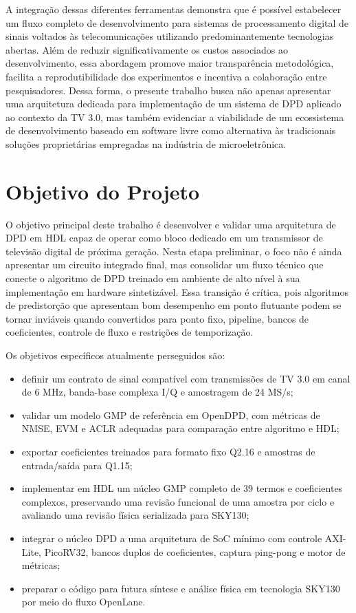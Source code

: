\documentclass[journal,comsoc]{IEEEtran}
\begin{document}
A integração dessas diferentes ferramentas demonstra que é possível estabelecer um fluxo completo de desenvolvimento para sistemas de processamento digital de sinais voltados às telecomunicações utilizando predominantemente tecnologias abertas. Além de reduzir significativamente os custos associados ao desenvolvimento, essa abordagem promove maior transparência metodológica, facilita a reprodutibilidade dos experimentos e incentiva a colaboração entre pesquisadores. Dessa forma, o presente trabalho busca não apenas apresentar uma arquitetura dedicada para implementação de um sistema de DPD aplicado ao contexto da TV 3.0, mas também evidenciar a viabilidade de um ecossistema de desenvolvimento baseado em software livre como alternativa às tradicionais soluções proprietárias empregadas na indústria de microeletrônica.

\section{Objetivo do Projeto}
O objetivo principal deste trabalho é desenvolver e validar uma arquitetura de DPD em HDL capaz de operar como bloco dedicado em um transmissor de televisão digital de próxima geração. Nesta etapa preliminar, o foco não é ainda apresentar um circuito integrado final, mas consolidar um fluxo técnico que conecte o algoritmo de DPD treinado em ambiente de alto nível à sua implementação em hardware sintetizável. Essa transição é crítica, pois algoritmos de predistorção que apresentam bom desempenho em ponto flutuante podem se tornar inviáveis quando convertidos para ponto fixo, pipeline, bancos de coeficientes, controle de fluxo e restrições de temporização.

Os objetivos específicos atualmente perseguidos são:

\begin{itemize}
    \item definir um contrato de sinal compatível com transmissões de TV 3.0 em canal de 6 MHz, banda-base complexa I/Q e amostragem de 24 MS/s;
    \item validar um modelo GMP de referência em OpenDPD, com métricas de NMSE, EVM e ACLR adequadas para comparação entre algoritmo e HDL;
    \item exportar coeficientes treinados para formato fixo Q2.16 e amostras de entrada/saída para Q1.15;
    \item implementar em HDL um núcleo GMP completo de 39 termos e coeficientes complexos, preservando uma revisão funcional de uma amostra por ciclo e avaliando uma revisão física serializada para SKY130;
    \item integrar o núcleo DPD a uma arquitetura de SoC mínimo com controle AXI-Lite, PicoRV32, bancos duplos de coeficientes, captura ping-pong e motor de métricas;
    \item preparar o código para futura síntese e análise física em tecnologia SKY130 por meio do fluxo OpenLane.
\end{itemize}
\end{document}
